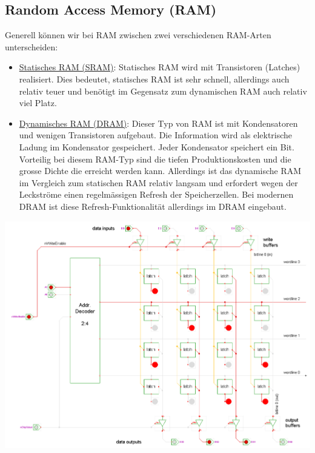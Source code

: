 \documentclass{report}
\begin{document}
\subsection{Random Access Memory (RAM)}
Generell können wir bei RAM zwischen zwei verschiedenen RAM-Arten unterscheiden:
\begin{itemize}
\item \underline{Statisches RAM (SRAM)}: Statisches RAM wird mit Transistoren (Latches) realisiert. Dies bedeutet, statisches RAM ist sehr schnell, allerdings auch relativ teuer und benötigt im Gegensatz zum dynamischen RAM auch relativ viel Platz.
\item \underline{Dynamisches RAM (DRAM)}: Dieser Typ von RAM ist mit Kondensatoren und wenigen Transistoren aufgebaut. Die Information wird als elektrische Ladung im Kondensator gespeichert. Jeder Kondensator speichert ein Bit. Vorteilig bei diesem RAM-Typ sind die tiefen Produktionskosten und die grosse Dichte die erreicht werden kann. Allerdings ist das dynamische RAM im Vergleich zum statischen RAM relativ langsam und erfordert wegen der Leckströme einen regelmässigen Refresh der Speicherzellen. Bei modernen DRAM ist diese Refresh-Funktionalität allerdings im DRAM eingebaut.
\end{itemize}
\begin{center}\includegraphics[scale=0.2]{img/ram.png}\end{center}
\end{document}
